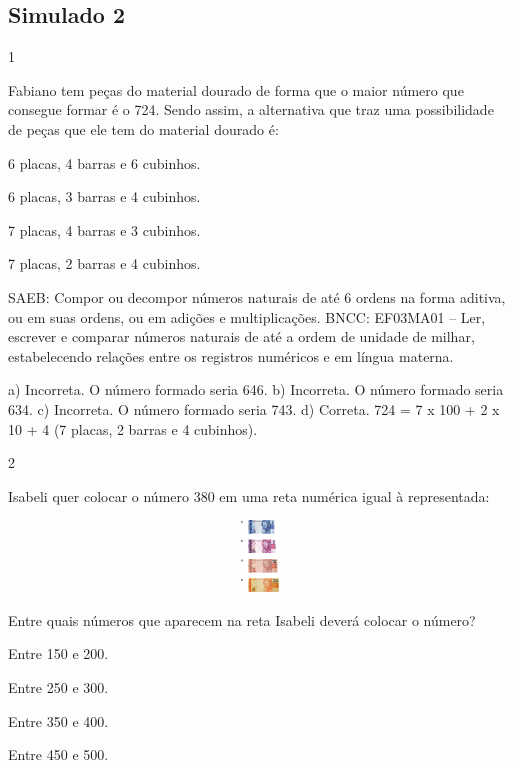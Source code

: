 \begin{multicols}{2}
{\begin{escolha}
{\chapter{Simulado 2}

\num{1}

Fabiano tem peças do material dourado de forma que o maior número
que consegue formar é o 724. Sendo assim, a alternativa que traz uma
possibilidade de peças que ele tem do material dourado é:

\begin{escolha}
\item
  6 placas, 4 barras e 6 cubinhos.
\item
  6 placas, 3 barras e 4 cubinhos.
\item
  7 placas, 4 barras e 3 cubinhos.
\item
  7 placas, 2 barras e 4 cubinhos.
\end{escolha}

SAEB: Compor ou decompor números naturais de até 6 ordens na forma aditiva, ou em suas ordens, ou em adições e multiplicações.
BNCC: EF03MA01 -- Ler, escrever e comparar números naturais de até a ordem de unidade de milhar, estabelecendo relações entre os registros numéricos e em língua materna.

a) Incorreta. O número formado seria 646.
b) Incorreta. O número formado seria 634.
c) Incorreta. O número formado seria 743.
d) Correta. 724 = 7 x 100 + 2 x 10 + 4 (7 placas, 2 barras e 4 cubinhos).

\num{2}

Isabeli quer colocar o número 380 em uma reta numérica igual à representada:


\includegraphics[width=5.90556in,height=0.74931in]{media/image117.png}

Entre quais números que aparecem na reta Isabeli deverá colocar o número?

\begin{escolha}
\item
  Entre 150 e 200.
\item
  Entre 250 e 300.
\item
  Entre 350 e 400.
\item
  Entre 450 e 500.
\end{escolha}

}
\end{escolha}}
\end{multicols}
